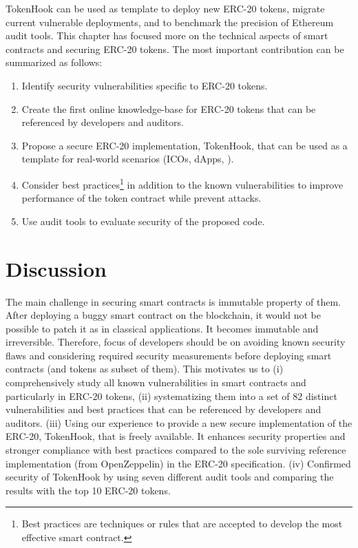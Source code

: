 TokenHook can be used as template to deploy new ERC-20 tokens, migrate current vulnerable deployments, and to benchmark the precision of Ethereum audit tools. This chapter has focused more on the technical aspects of smart contracts and securing ERC-20 tokens. The most important contribution can be summarized as follows:
\begin{enumerate}
	\item Identify security vulnerabilities specific to ERC-20 tokens.
	
	\item Create the first online knowledge-base for ERC-20 tokens that can be referenced by developers and auditors.
	
	\item Propose a secure ERC-20 implementation, TokenHook, that can be used as a template for real-world scenarios (\ie ICOs, dApps, \etc).
	
	\item Consider best practices\footnote{Best practices are techniques or rules that are accepted to develop the most effective smart contract.} in addition to the known vulnerabilities to improve performance of the token contract while prevent attacks.
	
	\item Use audit tools to evaluate security of the proposed code.
\end{enumerate}

\section{Discussion}
The main challenge in securing smart contracts is immutable property of them. After deploying a buggy smart contract on the blockchain, it would not be possible to patch it as in classical applications. It becomes immutable and irreversible. Therefore, focus of developers should be on avoiding known security flaws and considering required security measurements before deploying smart contracts (and tokens as subset of them). This motivates us to (i) comprehensively study all known vulnerabilities in smart contracts and particularly in ERC-20 tokens, (ii) systematizing them into a set of 82 distinct vulnerabilities and best practices that can be referenced by developers and auditors. (iii) Using our experience to provide a new secure implementation of the ERC-20, TokenHook, that is freely available. It enhances security properties and stronger compliance with best practices compared to the sole surviving reference implementation (from OpenZeppelin) in the ERC-20 specification. (iv) Confirmed security of TokenHook by using seven different audit tools and comparing the results with the top 10 ERC-20 tokens.